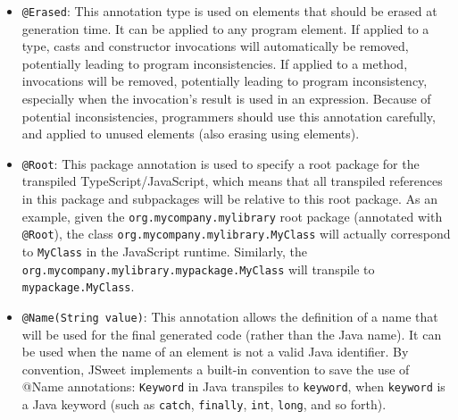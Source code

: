\documentclass[a4paper]{report}
\begin{document}
\begin{itemize}
\item \texttt{@Erased}: This annotation type is used on elements that should be erased at generation time. It can be applied to any program element. If applied to a type, casts and constructor invocations will automatically be removed, potentially leading to program inconsistencies. If applied to a method, invocations will be removed, potentially leading to program inconsistency, especially when the invocation's result is used in an expression. Because of potential inconsistencies, programmers should use this annotation carefully, and applied to unused elements (also erasing using elements).

\item \texttt{@Root}:  This package annotation is used to specify a root package for the transpiled  TypeScript/JavaScript, which means that all transpiled references in this package and subpackages will be relative to this root package. As an example, given the \texttt{org.mycompany.mylibrary} root package (annotated with \texttt{@Root}), the class \texttt{org\-.mycompany\-.mylibrary\-.MyClass} will actually correspond to \texttt{MyClass} in the JavaScript runtime. Similarly, the \texttt{org\-.mycompany\-.mylibrary\-.mypackage\-.MyClass} will transpile to \texttt{mypackage\-.MyClass}. 

\item \texttt{@Name(String value)}: This annotation allows the definition of a name that will be used for the final generated code (rather than the Java name). It can be used when the name of an element is not a valid Java identifier. By convention, JSweet implements a built-in convention to save the use of @Name annotations: \texttt{Keyword} in Java transpiles to \texttt{keyword}, when \texttt{keyword} is a Java keyword (such as \texttt{catch}, \texttt{finally}, \texttt{int}, \texttt{long}, and so forth).


\end{itemize}
\end{document}

